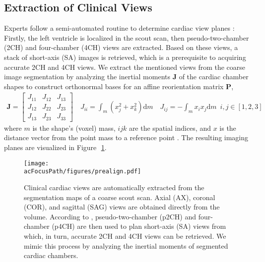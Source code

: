     \subsection{Extraction of Clinical Views}
    \label{sec:view_extraction}
    Experts follow a semi-automated routine to determine cardiac view planes \citep{herzog2017cardiovascular}: Firstly, the left ventricle is localized in the scout scan, then pseudo-two-chamber (2CH) and four-chamber (4CH) views are extracted. Based on these views, a stack of short-axis (SA) images is retrieved, which is a prerequisite to acquiring accurate 2CH and 4CH views.
   We extract the mentioned views from the coarse image segmentation by analyzing the inertial moments $\mathbf{J}$
   of the cardiac chamber shapes to construct orthonormal bases for an affine reorientation matrix $\mathbf{P}$,
    \begin{align}
        \mathbf{J} = \begin{bmatrix}
            J_{11} & J_{12} & J_{13}\\
            J_{12} & J_{22} & J_{23}\\
            J_{13} & J_{23} & J_{33}
            \end{bmatrix} \quad  J_{ii}= \int_{m} \left(x_j^2 + x_k^2\right) \text{d}m \quad J_{ij} = -\int_{m} x_i x_j \text{d}m \enspace i,j \in \left[1,2,3\right]
        \label{eq:inertia}
    \end{align}
    where $m$ is the shape's (voxel) mass, $ijk$ are the spatial indices, and $x$ is the distance vector from the point mass to a reference point \citep{czichos2012huette}. The resulting imaging planes are visualized in Figure~\,\ref{fig:prealign}.

    \begin{figure}
        \texttt{[image: \\acFocusPath/figures/prealign.pdf]}
        \caption{Clinical cardiac views are automatically extracted from the segmentation maps of a coarse scout scan. Axial (AX), coronal (COR), and sagittal (SAG) views are obtained directly from the volume. According to \citep{herzog2017cardiovascular}, pseudo-two-chamber (p2CH) and four-chamber (p4CH) are then used to plan short-axis (SA) views from which, in turn, accurate 2CH and 4CH views can be retrieved. We mimic this process by analyzing the inertial moments of segmented cardiac chambers.}
        \label{fig:prealign}
    \end{figure}



